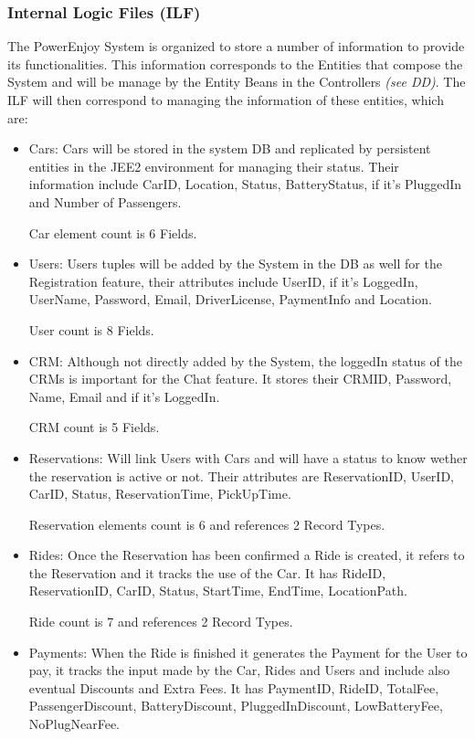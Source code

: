 \documentclass[a4paper]{article}
\begin{document}
\subsubsection{Internal Logic Files (ILF)}
The PowerEnjoy System is organized to store a number of information to provide its functionalities. This information corresponds to the Entities that compose the System and will be manage by the Entity Beans in the Controllers \textit{(see DD)}. The ILF will then correspond to managing the information of these entities, which are:
\begin{itemize}
\item Cars: Cars will be stored in the system DB and replicated by persistent entities in the JEE2 environment for managing their status. Their information include CarID, Location, Status, BatteryStatus, if it's PluggedIn and Number of Passengers. \par Car element count is 6 Fields.
\item Users: Users tuples will be added by the System in the DB as well for the Registration feature, their attributes include UserID, if it's LoggedIn, UserName, Password, Email, DriverLicense, PaymentInfo and Location. 
\par User count is 8 Fields.
\item CRM: Although not directly added by the System, the loggedIn status of the CRMs is important for the Chat feature. It stores their CRMID, Password, Name, Email and if it's LoggedIn. 
\par CRM count is 5 Fields.
\item Reservations: Will link Users with Cars and will have a status to know wether the reservation is active or not. Their attributes are ReservationID, UserID, CarID, Status, ReservationTime, PickUpTime.
\par Reservation elements count is 6 and references 2 Record Types.
\item Rides: Once the Reservation has been confirmed a Ride is created, it refers to the Reservation and it tracks the use of the Car. It has RideID, ReservationID, CarID, Status, StartTime, EndTime, LocationPath.
\par Ride count is 7 and references 2 Record Types.
\item Payments: When the Ride is finished it generates the Payment for the User to pay, it tracks the input made by the Car, Rides and Users and include also eventual Discounts and Extra Fees. It has PaymentID, RideID, TotalFee, PassengerDiscount, BatteryDiscount, PluggedInDiscount, LowBatteryFee, NoPlugNearFee.

\end{itemize}
\end{document}
